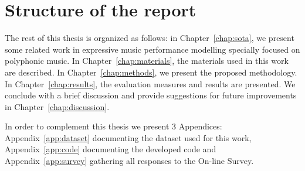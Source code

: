 \section{Structure of the report}
The rest of this thesis is organized as follows: in Chapter~\ref{chap:sota}, we present some related work in expressive music performance modelling specially focused on polyphonic music. In Chapter~\ref{chap:materials}, the materials used in this work are described. In Chapter~\ref{chap:methods}, we present the proposed methodology. In Chapter~\ref{chap:results}, the evaluation measures and results are presented. We conclude with a brief discussion and provide suggestions for future improvements in Chapter~\ref{chap:discussion}. 

In order to complement this thesis we present 3 Appendices: Appendix~\ref{app:dataset} documenting the dataset used for this work, Appendix~\ref{app:code} documenting the developed code and Appendix~\ref{app:survey} gathering all responses to the On-line Survey.
\cleardoublepage

